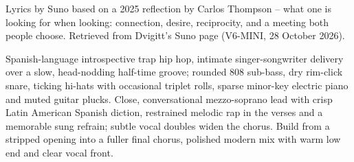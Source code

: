 
\begin{notes}
Lyrics by Suno based on a 2025 reflection by Carlos Thompson -- what one is looking for when looking: connection, desire, reciprocity, and a meeting both people choose. Retrieved from Dvigitt's Suno page (V6-MINI, 28 October 2026).
\end{notes}
\begin{style}
Spanish-language introspective trap hip hop, intimate singer-songwriter delivery over a slow, head-nodding half-time groove; rounded 808 sub-bass, dry rim-click snare, ticking hi-hats with occasional triplet rolls, sparse minor-key electric piano and muted guitar plucks. Close, conversational mezzo-soprano lead with crisp Latin American Spanish diction, restrained melodic rap in the verses and a memorable sung refrain; subtle vocal doubles widen the chorus. Build from a stripped opening into a fuller final chorus, polished modern mix with warm low end and clear vocal front.
\end{style}
